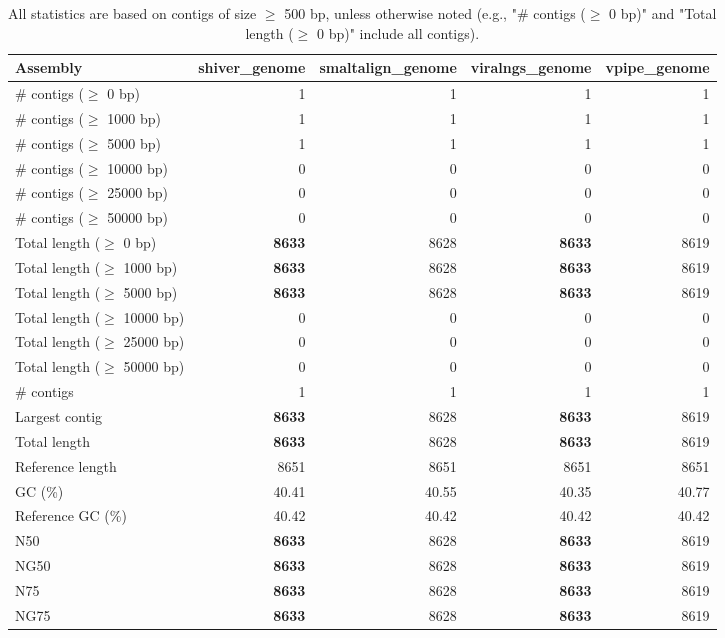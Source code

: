 \documentclass[12pt,a4paper]{article}
\begin{document}
\begin{table}[ht]
\begin{center}
\caption{All statistics are based on contigs of size $\geq$ 500 bp, unless otherwise noted (e.g., "\# contigs ($\geq$ 0 bp)" and "Total length ($\geq$ 0 bp)" include all contigs).}
\begin{tabular}{|l*{4}{|r}|}
\hline
Assembly & shiver\_genome & smaltalign\_genome & viralngs\_genome & vpipe\_genome \\ \hline
\# contigs ($\geq$ 0 bp) & 1 & 1 & 1 & 1 \\ \hline
\# contigs ($\geq$ 1000 bp) & 1 & 1 & 1 & 1 \\ \hline
\# contigs ($\geq$ 5000 bp) & 1 & 1 & 1 & 1 \\ \hline
\# contigs ($\geq$ 10000 bp) & 0 & 0 & 0 & 0 \\ \hline
\# contigs ($\geq$ 25000 bp) & 0 & 0 & 0 & 0 \\ \hline
\# contigs ($\geq$ 50000 bp) & 0 & 0 & 0 & 0 \\ \hline
Total length ($\geq$ 0 bp) & {\bf 8633} & 8628 & {\bf 8633} & 8619 \\ \hline
Total length ($\geq$ 1000 bp) & {\bf 8633} & 8628 & {\bf 8633} & 8619 \\ \hline
Total length ($\geq$ 5000 bp) & {\bf 8633} & 8628 & {\bf 8633} & 8619 \\ \hline
Total length ($\geq$ 10000 bp) & 0 & 0 & 0 & 0 \\ \hline
Total length ($\geq$ 25000 bp) & 0 & 0 & 0 & 0 \\ \hline
Total length ($\geq$ 50000 bp) & 0 & 0 & 0 & 0 \\ \hline
\# contigs & 1 & 1 & 1 & 1 \\ \hline
Largest contig & {\bf 8633} & 8628 & {\bf 8633} & 8619 \\ \hline
Total length & {\bf 8633} & 8628 & {\bf 8633} & 8619 \\ \hline
Reference length & 8651 & 8651 & 8651 & 8651 \\ \hline
GC (\%) & 40.41 & 40.55 & 40.35 & 40.77 \\ \hline
Reference GC (\%) & 40.42 & 40.42 & 40.42 & 40.42 \\ \hline
N50 & {\bf 8633} & 8628 & {\bf 8633} & 8619 \\ \hline
NG50 & {\bf 8633} & 8628 & {\bf 8633} & 8619 \\ \hline
N75 & {\bf 8633} & 8628 & {\bf 8633} & 8619 \\ \hline
NG75 & {\bf 8633} & 8628 & {\bf 8633} & 8619 \\ \hline

\end{tabular}
\end{center}
\end{table}
\end{document}
